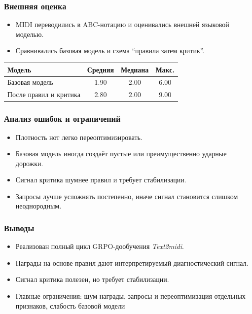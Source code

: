 \documentclass[aspectratio=169]{beamer}
\begin{document}
\begin{frame}
\frametitle{Внешняя оценка}
\begin{itemize}
    \item MIDI переводились в ABC-нотацию и оценивались внешней языковой моделью.
    \item Сравнивались базовая модель и схема ``правила затем критик''.
\end{itemize}

\medskip
\centering
\small
\begin{tabular}{lccc}
\toprule
\textbf{Модель} & \textbf{Средняя} & \textbf{Медиана} & \textbf{Макс.} \\
\midrule
Базовая модель & 1.90 & 2.00 & 6.00 \\
После правил и критика & 2.80 & 2.00 & 9.00 \\
\bottomrule
\end{tabular}
\end{frame}

\begin{frame}
\frametitle{Анализ ошибок и ограничений}
\begin{itemize}
    \item Плотность нот легко переоптимизировать.
    \item Базовая модель иногда создаёт пустые или преимущественно ударные дорожки.
    \item Сигнал критика шумнее правил и требует стабилизации.
    \item Запросы лучше усложнять постепенно, иначе сигнал становится слишком неоднородным.
\end{itemize}
\end{frame}

\begin{frame}
\frametitle{Выводы}
\begin{itemize}
    \item Реализован полный цикл GRPO-дообучения \textit{Text2midi}.
    \item Награды на основе правил дают интерпретируемый диагностический сигнал.
    \item Сигнал критика полезен, но требует стабилизации.
    \item Главные ограничения: шум награды, запросы и переоптимизация отдельных признаков, слабость базовой модели
\end{itemize}
\end{frame}
\end{document}
